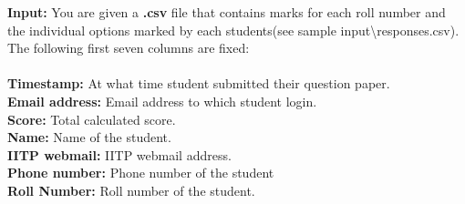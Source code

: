 \documentclass{article}
\begin{document}
\textbf{Input:}
You are given a \textbf{.csv} file that contains marks for each roll number and 
the individual options marked by each students(see sample 
input\textbackslash responses.csv). The 
following first seven 
columns are fixed: \\
\\
\textbf{Timestamp:}	At what time student submitted their question paper.\\
\textbf{Email address:}	Email address to which student login.\\       
\textbf{Score:}	Total calculated score.\\
\textbf{Name:}	Name of the student.\\
\textbf{IITP webmail:}	IITP webmail address.\\
\textbf{Phone number:} Phone number of the student\\
\textbf{Roll Number:} Roll number of the student.\\
\end{document}
